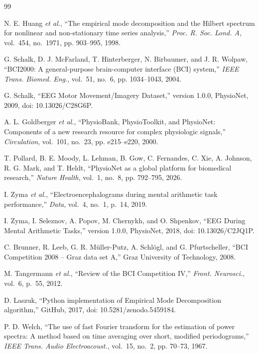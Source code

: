 \begin{thebibliography}{99}

N. E. Huang \emph{et al.}, ``The empirical mode decomposition and the Hilbert spectrum for nonlinear and non-stationary time series analysis,'' \emph{Proc. R. Soc. Lond. A}, vol.~454, no.~1971, pp. 903--995, 1998.

G. Schalk, D. J. McFarland, T. Hinterberger, N. Birbaumer, and J. R. Wolpaw, ``BCI2000: A general-purpose brain-computer interface (BCI) system,'' \emph{IEEE Trans. Biomed. Eng.}, vol.~51, no.~6, pp. 1034--1043, 2004.

G. Schalk, ``EEG Motor Movement/Imagery Dataset,'' version 1.0.0, PhysioNet, 2009, doi: 10.13026/C28G6P.

A. L. Goldberger \emph{et al.}, ``PhysioBank, PhysioToolkit, and PhysioNet: Components of a new research resource for complex physiologic signals,'' \emph{Circulation}, vol.~101, no.~23, pp. e215--e220, 2000.

T. Pollard, B. E. Moody, L. Lehman, B. Gow, C. Fernandes, C. Xie, A. Johnson, R. G. Mark, and T. Heldt, ``PhysioNet as a global platform for biomedical research,'' \emph{Nature Health}, vol.~1, no.~8, pp. 792--795, 2026.

I. Zyma \emph{et al.}, ``Electroencephalograms during mental arithmetic task performance,'' \emph{Data}, vol.~4, no.~1, p.~14, 2019.

I. Zyma, I. Seleznov, A. Popov, M. Chernykh, and O. Shpenkov, ``EEG During Mental Arithmetic Tasks,'' version 1.0.0, PhysioNet, 2018, doi: 10.13026/C2JQ1P.

C. Brunner, R. Leeb, G. R. M{\"u}ller-Putz, A. Schl{\"o}gl, and G. Pfurtscheller, ``BCI Competition 2008 -- Graz data set A,'' Graz University of Technology, 2008.

M. Tangermann \emph{et al.}, ``Review of the BCI Competition IV,'' \emph{Front. Neurosci.}, vol.~6, p.~55, 2012.

D. Laszuk, ``Python implementation of Empirical Mode Decomposition algorithm,'' GitHub, 2017, doi: 10.5281/zenodo.5459184.

P. D. Welch, ``The use of fast Fourier transform for the estimation of power spectra: A method based on time averaging over short, modified periodograms,'' \emph{IEEE Trans. Audio Electroacoust.}, vol.~15, no.~2, pp. 70--73, 1967.


\end{thebibliography}

